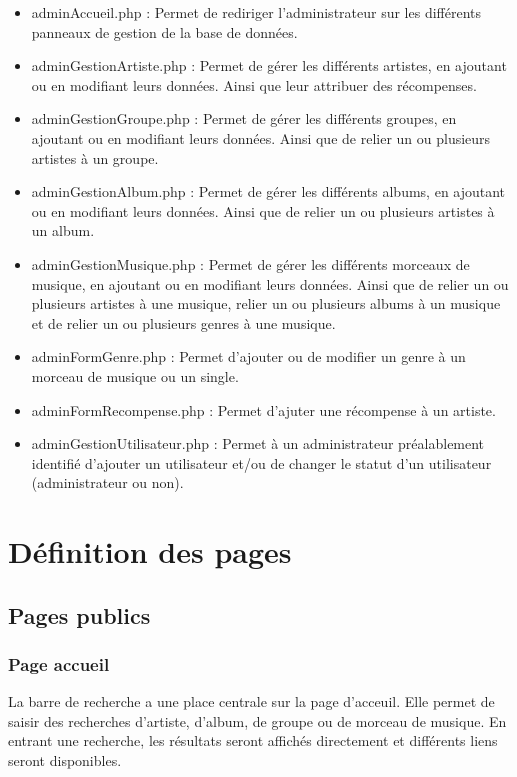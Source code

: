 	\begin{paragraphe}
		\begin{itemize}
			\item adminAccueil.php : Permet de rediriger l'administrateur sur les différents panneaux de gestion de la base de données.
			\item adminGestionArtiste.php : Permet de gérer les différents artistes, en ajoutant ou en modifiant leurs données. Ainsi que leur attribuer des récompenses.
			\item adminGestionGroupe.php : Permet de gérer les différents groupes, en ajoutant ou en modifiant leurs données. Ainsi que de relier un ou plusieurs artistes à un groupe.
			\item adminGestionAlbum.php : Permet de gérer les différents albums, en ajoutant ou en modifiant leurs données. Ainsi que de relier un ou plusieurs artistes à un album.
			\item adminGestionMusique.php : Permet de gérer les différents morceaux de musique, en ajoutant ou en modifiant leurs données. Ainsi que de relier un ou plusieurs artistes à une musique, relier un ou plusieurs albums à un musique et de relier un ou plusieurs genres à une musique.
			\item adminFormGenre.php : Permet d'ajouter ou de modifier un genre à un morceau de musique ou un single.
			\item adminFormRecompense.php : Permet d'ajuter une récompense à un artiste.
			\item adminGestionUtilisateur.php : Permet à un administrateur préalablement identifié d'ajouter un utilisateur et/ou de changer le statut d'un utilisateur (administrateur ou non).
		\end{itemize}
	\end{paragraphe}

\newpage

\section{Définition des pages}

	\subsection{Pages publics}
		\subsubsection{Page accueil}

			\begin{paragraphe}
                La barre de recherche a une place centrale sur la page d'acceuil. Elle permet de saisir des recherches d’artiste, d’album, de groupe ou de morceau de musique.
				En entrant une recherche, les résultats seront affichés directement et différents liens seront disponibles.
			\end{paragraphe}

